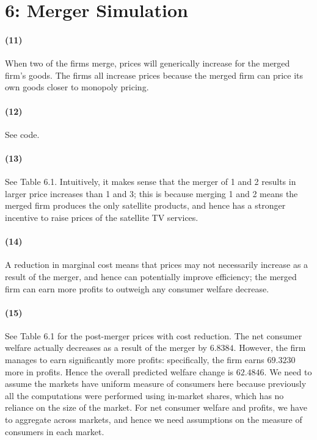 \documentclass[10pt,letter]{article}
\begin{document}






\section*{6: Merger Simulation}
\paragraph{(11)} When two of the firms merge, prices will generically increase for the merged firm's goods. The firms all increase prices because the merged firm can price its own goods closer to monopoly pricing.
\paragraph{(12)} See code.
\paragraph{(13)} See Table 6.1. Intuitively, it makes sense that the merger of 1 and 2 results in larger price increases than 1 and 3; this is because merging 1 and 2 means the merged firm produces the only satellite products, and hence has a stronger incentive to raise prices of the satellite TV services.
\paragraph{(14)} A reduction in marginal cost means that prices may not necessarily increase as a result of the merger, and hence can potentially improve efficiency; the merged firm can earn more profits to outweigh any consumer welfare decrease.
\paragraph{(15)} See Table 6.1 for the post-merger prices with cost reduction. The net consumer welfare actually decreases as a result of the merger by $6.8384$. However, the firm manages to earn significantly more profits: specifically, the firm earns $69.3230$ more in profits. Hence the overall predicted welfare change is $62.4846$. We need to assume the markets have uniform measure of consumers here because previously all the computations were performed using in-market shares, which has no reliance on the size of the market. For net consumer welfare and profits, we have to aggregate across markets, and hence we need assumptions on the measure of consumers in each market.

\end{document}
